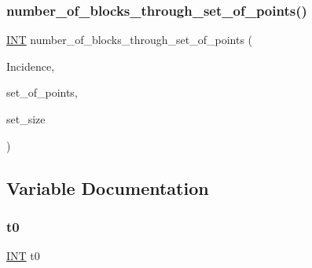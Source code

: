 \subsubsection{\texorpdfstring{number\+\_\+of\+\_\+blocks\+\_\+through\+\_\+set\+\_\+of\+\_\+points()}{number\_of\_blocks\_through\_set\_of\_points()}}
{\footnotesize\ttfamily \mbox{\hyperlink{galois_8h_a09fddde158a3a20bd2dcadb609de11dc}{I\+NT}} number\+\_\+of\+\_\+blocks\+\_\+through\+\_\+set\+\_\+of\+\_\+points (\begin{DoxyParamCaption}\item[{\mbox{\hyperlink{classincidence__structure}{incidence\+\_\+structure}} $\ast$}]{Incidence,  }\item[{\mbox{\hyperlink{galois_8h_a09fddde158a3a20bd2dcadb609de11dc}{I\+NT}} $\ast$}]{set\+\_\+of\+\_\+points,  }\item[{\mbox{\hyperlink{galois_8h_a09fddde158a3a20bd2dcadb609de11dc}{I\+NT}}}]{set\+\_\+size }\end{DoxyParamCaption})}



\subsection{Variable Documentation}
\mbox{\label{_a_p_p_s_2_c_o_m_b_i_n_a_t_o_r_i_c_s_2design_8_c_a4268f4fe222ffb119218a0199f5e1904}} 
\subsubsection{\texorpdfstring{t0}{t0}}
{\footnotesize\ttfamily \mbox{\hyperlink{galois_8h_a09fddde158a3a20bd2dcadb609de11dc}{I\+NT}} t0}

